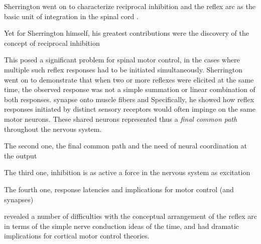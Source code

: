 
Sherrington went on to characterize reciprocal inhibition and the reflex arc as the basic unit of integration in the spinal cord \cite{Sherrington1906}.

Yet for Sherrington himself, his greatest contributions were the discovery of the concept of reciprocal inhibition

This posed a significant problem for spinal motor control, in the cases where multiple such reflex responses had to be initiated simultaneously. Sherrington went on to demonstrate that when two or more reflexes were elicited at the same time, the observed response was not a simple summation or linear combination of both responses. synapse onto muscle fibers and  Specifically, he showed how reflex responses initiated by distinct sensory receptors would often impinge on the same motor neurons. These shared neurons represented thus a \emph{final common path} \cite{Sherrington1904} throughout the nervous system.

The second one, the final common path and the need of neural coordination at the output

The third one, inhibition is as active a force in the nervous system as excitation

The fourth one, response latencies and implications for motor control (and synapses)

 revealed a number of difficulties with the conceptual arrangement of the reflex arc in terms of the simple nerve conduction ideas of the time, and had dramatic implications for cortical motor control theories.

